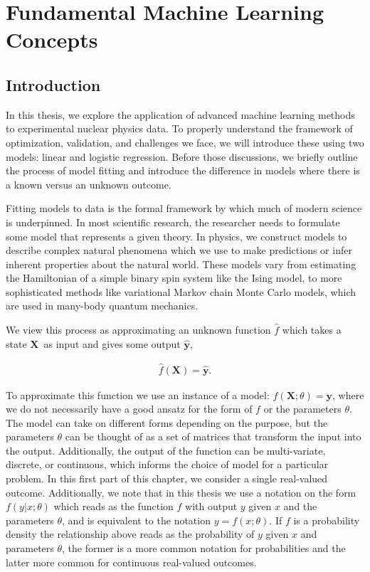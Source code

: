 \chapter{Fundamental Machine Learning Concepts}\label{chap:fundament}
\section{Introduction}\label{sec:fundament_intro}

In this thesis, we explore the application of advanced machine learning methods to experimental nuclear physics data. To properly understand the framework of optimization, validation, and challenges we face, we will introduce these using two models: linear and logistic regression. Before those discussions, we briefly outline the process of model fitting and introduce the difference in models where there is a known versus an unknown outcome.

Fitting models to data is the formal framework by which much of modern science is underpinned. In most scientific research, the researcher needs to formulate some model that represents a given theory. In physics, we construct models to describe complex natural phenomena which we use to make predictions or infer inherent properties about the natural world. These models vary from estimating the Hamiltonian of a simple binary spin system like the Ising model, to more sophisticated methods like variational Markov chain Monte Carlo models, which are used in many-body quantum mechanics.

We view this process as approximating an unknown function $\hat{f}$ which takes a state $\mathbf{X}$ as input and gives some output $\mathbf{\hat{y}}$,  
 
 \begin{align}
 \hat{f}(\mathbf{X}) = \mathbf{\hat{y}}.
 \end{align}

\noindent To approximate this function we use an instance of a model: $f(\mathbf{X}; \theta) = \mathbf{y}$, where we do not necessarily have a good ansatz for the form of $f$ or the parameters $\theta$. The model can take on different forms depending on the purpose, but the parameters $\theta$ can be thought of as a set of matrices that transform the input into the output. Additionally, the output of the function can be multi-variate, discrete, or continuous, which informs the choice of model for a particular problem. In this first part of this chapter, we consider a single real-valued outcome. Additionally, we note  that in this thesis we use a notation on the form $f(y | x; \theta )$ which reads as the function $f$ with output $y$ given $x$ and the parameters $\theta$, and is equivalent to the notation $y = f(x; \theta)$. If $f$ is a probability density the relationship above reads as the probability of $y$ given $x$ and parameters $\theta$, the former is a more common notation for probabilities and the latter more common for continuous real-valued outcomes. 

